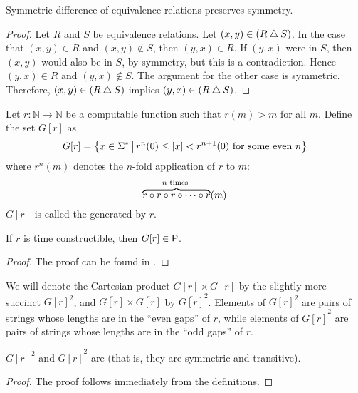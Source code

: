 \begin{proposition}\label{prop:symdiff}
  Symmetric difference of equivalence relations preserves symmetry.
\end{proposition}
\begin{proof}
  Let $R$ and $S$ be equivalence relations.
  Let $(x,y)\in(R\symdiff S)$.
  In the case that $(x,y)\in R$ and $(x,y)\notin S$, then $(y,x)\in R$.
  If $(y,x)$ were in $S$, then $(x,y)$ would also be in $S$, by symmetry, but this is a contradiction.
  Hence $(y,x)\in R$ and $(y,x)\notin S$.
  The argument for the other case is symmetric.
  Therefore, $(x, y) \in (R \symdiff S)$ implies $(y, x) \in (R \symdiff S)$.
\end{proof}

\begin{definition}
  Let $r\colon\mathbb{N}\to\mathbb{N}$ be a computable function such that $r(m)>m$ for all $m$.
  Define the set $G[r]$ as
  \begin{displaymath}
    G[r]=\lb x\in\Sigma^* \st r^n(0)\leq|x|<r^{n+1}(0) \plain{for some even} n\rb
  \end{displaymath}
  where $r^n(m)$ denotes the $n$-fold application of $r$ to $m$:
  \begin{displaymath}
    \overbrace{r\circ r\circ r\circ\cdots\circ r}^{n \plain{times}}(m)
  \end{displaymath}
  $G[r]$ is called the  generated by $r$.
\end{definition}

\begin{lemma}\label{lem:gap_p}
  If $r$ is time constructible, then $G[r]\in\P$.
\end{lemma}
\begin{proof}
  The proof can be found in \autocite{bdg95}.
\end{proof}

We will denote the Cartesian product $G[r]\times G[r]$ by the slightly more succinct ${G[r]}^2$, and $\overline{G[r]}\times\overline{G[r]}$ by $\overline{G[r]}^2$.
Elements of ${G[r]}^2$ are pairs of strings whose lengths are in the ``even gaps'' of $r$, while elements of $\overline{G[r]}^2$ are pairs of strings whose lengths are in the ``odd gaps'' of $r$.

\begin{lemma}
  ${G[r]}^2$ and $\overline{G[r]}^2$ are  (that is, they are symmetric and transitive).
\end{lemma}
\begin{proof}
  The proof follows immediately from the definitions.
\end{proof}

